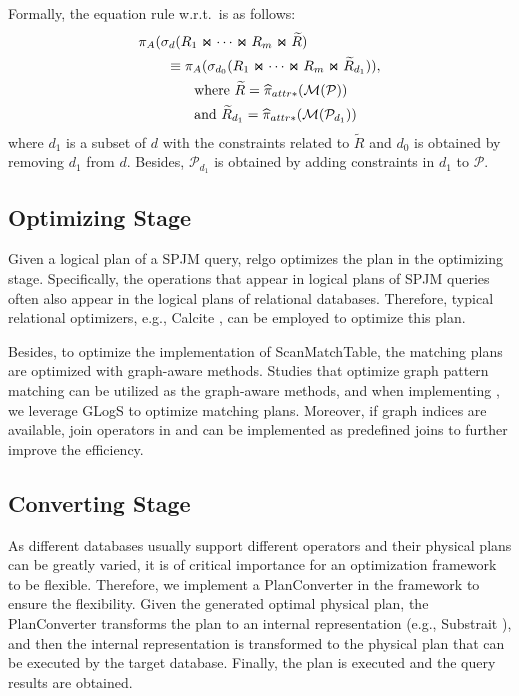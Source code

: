 {Formally, the equation rule w.r.t.~\filterrule is as follows:
\begin{equation}
    \begin{split}
        & \pi_A(\sigma_{d}(R_1 \Join \cdots \Join R_m \Join \widetilde{R}) \\
        & \hspace*{2em} \equiv \pi_A(\sigma_{d_0}(R_1 \Join \cdots \Join R_m \Join \widetilde{R}_{d_1})), \\
        & \hspace*{4em} \text{where } \widetilde{R} = \widehat{\pi}_{attr*}(\mathcal{M}(\mathcal{P})) \\
        & \hspace*{4em} \text{and } \widetilde{R}_{d_1} = \widehat{\pi}_{attr*}(\mathcal{M}(\mathcal{P}_{d_1}))
    \end{split}
\end{equation}
where $d_1$ is a subset of $d$ with the constraints related to $\widetilde{R}$ and $d_0$ is obtained by removing $d_1$ from $d$.
Besides, $\mathcal{P}_{d_1}$ is obtained by adding constraints in $d_1$ to $\mathcal{P}$.

\subsection{Optimizing Stage}

Given a logical plan of a SPJM query, relgo optimizes the plan in the optimizing stage.
Specifically, the operations that appear in logical plans of SPJM queries often also appear in the logical plans of relational databases.
Therefore, typical relational optimizers, e.g., Calcite \cite{calcite}, can be employed to optimize this plan.

Besides, to optimize the implementation of ScanMatchTable, the matching plans are optimized with graph-aware methods.
Studies that optimize graph pattern matching can be utilized as the graph-aware methods, and when implementing \name, we leverage GLogS \cite{GLogS} to optimize matching plans.
Moreover, if graph indices are available, join operators in \expandvertex and \expandintersect can be implemented as predefined joins to further improve the efficiency.


\subsection{Converting Stage}

As different databases usually support different operators and their physical plans can be greatly varied, it is of critical importance for an optimization framework to be flexible.
Therefore, we implement a PlanConverter in the framework to ensure the flexibility.
Given the generated optimal physical plan, the PlanConverter transforms the plan to an internal representation (e.g., Substrait \cite{substrait}), and then the internal representation is transformed to the physical plan that can be executed by the target database.
Finally, the plan is executed and the query results are obtained.


}
